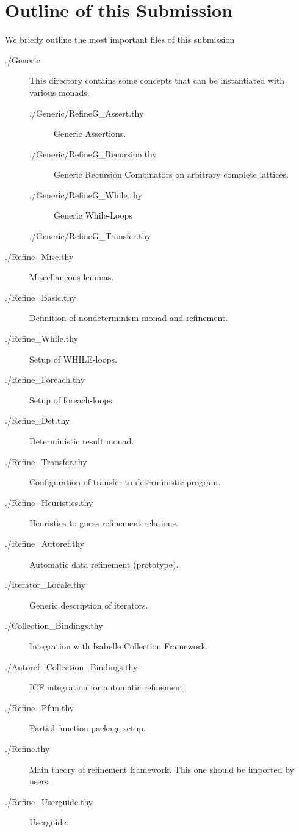 \documentclass[11pt,a4paper]{book}
\begin{document}
\section { Outline of this Submission }
We briefly outline the most important files of this submission
\begin{description}
\item[./Generic] This directory contains some concepts that can be instantiated with
  various monads.
\begin{description}
\item[./Generic/RefineG\_Assert.thy]
  Generic Assertions.
\item[./Generic/RefineG\_Recursion.thy]
  Generic Recursion Combinators on arbitrary complete lattices.
\item[./Generic/RefineG\_While.thy]
  Generic While-Loops
\item[./Generic/RefineG\_Transfer.thy]
\end{description}    
\item[./Refine\_Misc.thy] Miscellaneous lemmas.
\item[./Refine\_Basic.thy] Definition of nondeterminism monad and refinement.
\item[./Refine\_While.thy] Setup of WHILE-loops.
\item[./Refine\_Foreach.thy] Setup of foreach-loops.
\item[./Refine\_Det.thy] Deterministic result monad.
\item[./Refine\_Transfer.thy] Configuration of transfer to deterministic program.


\item[./Refine\_Heuristics.thy] Heuristics to guess refinement relations.
\item[./Refine\_Autoref.thy] Automatic data refinement (prototype).

\item[./Iterator\_Locale.thy] Generic description of iterators.
\item[./Collection\_Bindings.thy] Integration with Isabelle Collection Framework.
\item[./Autoref\_Collection\_Bindings.thy] ICF integration for automatic refinement.
\item[./Refine\_Pfun.thy] Partial function package setup.
\item[./Refine.thy] Main theory of refinement framework. This one should be 
  imported by users.
\item[./Refine\_Userguide.thy] Userguide.


\end{description}
\end{document}

